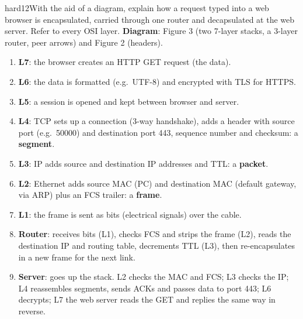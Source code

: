 \documentclass[10pt]{article}
\begin{document}
\begin{practice}{hard}{12}With the aid of a diagram, explain how a request typed into a web browser is encapsulated, carried through one router and decapsulated at the web server. Refer to every OSI layer.
\sol
\textbf{Diagram}: Figure 3 (two 7-layer stacks, a 3-layer router, peer arrows) and Figure 2 (headers).
\begin{enumerate}
\item \textbf{L7}: the browser creates an HTTP GET request (the data).
\item \textbf{L6}: the data is formatted (e.g.\ UTF-8) and encrypted with TLS for HTTPS.
\item \textbf{L5}: a session is opened and kept between browser and server.
\item \textbf{L4}: TCP sets up a connection (3-way handshake), adds a header with source port (e.g.\ 50000) and destination port 443, sequence number and checksum: a \textbf{segment}.
\item \textbf{L3}: IP adds source and destination IP addresses and TTL: a \textbf{packet}.
\item \textbf{L2}: Ethernet adds source MAC (PC) and destination MAC (default gateway, via ARP) plus an FCS trailer: a \textbf{frame}.
\item \textbf{L1}: the frame is sent as bits (electrical signals) over the cable.
\item \textbf{Router}: receives bits (L1), checks FCS and strips the frame (L2), reads the destination IP and routing table, decrements TTL (L3), then re-encapsulates in a new frame for the next link.
\item \textbf{Server}: goes up the stack. L2 checks the MAC and FCS; L3 checks the IP; L4 reassembles segments, sends ACKs and passes data to port 443; L6 decrypts; L7 the web server reads the GET and replies the same way in reverse.
\end{enumerate}
\end{practice}
\end{document}
